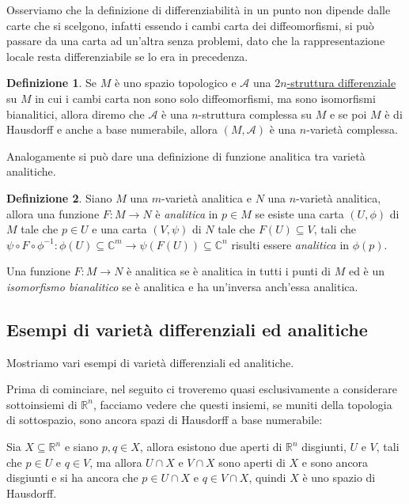 \documentclass[12pt, a4paper]{article}
\theoremstyle{definition}
\newtheorem{defi}{Definizione}
\begin{document}
Osserviamo che la definizione di differenziabilità in un punto non dipende dalle carte che si scelgono, infatti essendo i cambi carta dei diffeomorfismi, si può passare da una carta
ad un'altra senza problemi, dato che la rappresentazione locale resta differenziabile se lo era in precedenza.

\begin{defi} \label{def:varietà-analitica}
Se $M$ è uno spazio topologico e $\mathcal{A}$ una \hyperref[def:struttura-differenziale]{$2n$-struttura differenziale} su $M$ in cui i cambi carta non sono solo diffeomorfismi,
ma sono isomorfismi bianalitici, allora diremo che $\mathcal{A}$ è una $n$-struttura complessa su $M$ e se poi $M$ è di Hausdorff e anche a base numerabile, allora
$(M, \mathcal{A})$ è una $n$-varietà complessa.
\end{defi}

Analogamente si può dare una definizione di funzione analitica tra varietà analitiche.

\begin{defi} \label{def:funzione-analitica}
Siano $M$ una $m$-varietà analitica e $N$ una $n$-varietà analitica, allora una funzione $F : M \to N$ è \emph{analitica} in $p \in M$ se esiste una carta $(U, \phi)$ di $M$
tale che $p \in U$ e una carta $(V, \psi)$ di $N$ tale che $F(U) \subseteq V$, tali che $\psi \circ F \circ \phi^{-1} : \phi(U) \subseteq \mathbb{C}^m \to \psi(F(U)) \subseteq \mathbb{C}^n$
risulti essere \emph{analitica} in $\phi(p)$.

Una funzione $F : M \to N$ è analitica se è analitica in tutti i punti di $M$ ed è un \emph{isomorfismo bianalitico} se è analitica e ha un'inversa anch'essa analitica.
\end{defi}

\subsection{Esempi di varietà differenziali ed analitiche}
Mostriamo vari esempi di varietà differenziali ed analitiche.

Prima di cominciare, nel seguito ci troveremo quasi esclusivamente a considerare sottoinsiemi di $\mathbb{R}^n$, facciamo vedere che questi insiemi, se muniti della topologia di sottospazio,
sono ancora spazi di Hausdorff a base numerabile:

Sia $X \subseteq \mathbb{R}^n$ e siano $p, q \in X$, allora esistono due aperti di $\mathbb{R}^n$ disgiunti, $U$ e $V$, tali che $p \in U$ e $q \in V$, ma allora $U \cap X$ e $V \cap X$
sono aperti di $X$ e sono ancora disgiunti e si ha ancora che $p \in U \cap X$ e $q \in V \cap X$, quindi $X$ è uno spazio di Hausdorff.
\end{document}
